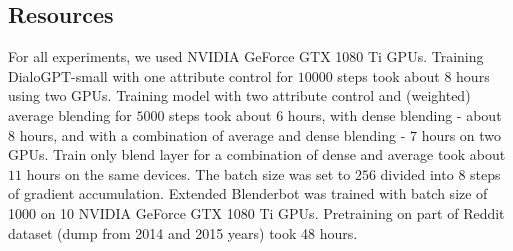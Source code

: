 \documentclass[11pt]{article}
\begin{document}







\subsection{Resources}
\label{sec:resources_consumption}
For all experiments, we used NVIDIA GeForce GTX 1080 Ti GPUs. Training DialoGPT-small with one attribute control for $10000$ steps took about $8$ hours using two GPUs. Training model with two attribute control and (weighted) average blending for $5000$ steps took about $6$ hours, with dense blending - about $8$ hours, and with a combination of average and dense blending - $7$ hours on two GPUs. Train only blend layer for a combination of dense and average took about $11$ hours on the same devices. The batch size was set to $256$ divided into $8$ steps of gradient accumulation. Extended Blenderbot was trained with batch size of 1000 on 10 NVIDIA GeForce GTX 1080 Ti GPUs. Pretraining on part of Reddit dataset (dump from 2014 and 2015 years) took 48 hours. 
\end{document}

